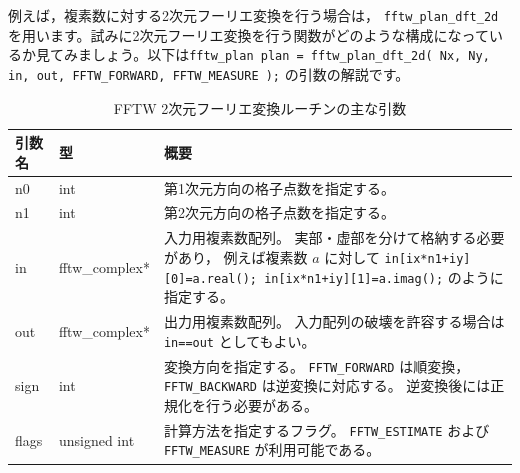 \documentclass[12pt]{jreport}
\begin{document}
例えば，複素数に対する2次元フーリエ変換を行う場合は，
\texttt{fftw\_plan\_dft\_2d} を用います。試みに2次元フーリエ変換を行う関数がどのような構成になっているか見てみましょう。以下は\texttt{fftw_plan plan = fftw_plan_dft_2d(
    Nx, Ny,
    in, out,
    FFTW_FORWARD,
    FFTW_MEASURE
);}
の引数の解説です。


\begin{table}[H]
\centering
\caption{FFTW 2次元フーリエ変換ルーチンの主な引数}
\renewcommand{\arraystretch}{1.3}

\begin{tabularx}{\textwidth}{|l|l|X|}
\hline
\rowcolor{tableblue!20}
\textbf{引数名} & \textbf{型} & \textbf{概要} \\
\hline

n0 & int &
第1次元方向の格子点数を指定する。 \\
\hline

n1 & int &
第2次元方向の格子点数を指定する。 \\
\hline

in & fftw\_complex* &
入力用複素数配列。
実部・虚部を分けて格納する必要があり，
例えば複素数 $a$ に対して
\texttt{in[ix*n1+iy][0]=a.real();\ in[ix*n1+iy][1]=a.imag();}
のように指定する。 \\
\hline

out & fftw\_complex* &
出力用複素数配列。
入力配列の破壊を許容する場合は
\texttt{in==out} としてもよい。 \\
\hline

sign & int &
変換方向を指定する。
\texttt{FFTW\_FORWARD} は順変換，
\texttt{FFTW\_BACKWARD} は逆変換に対応する。
逆変換後には正規化を行う必要がある。 \\
\hline

flags & unsigned int &
計算方法を指定するフラグ。
\texttt{FFTW\_ESTIMATE} および
\texttt{FFTW\_MEASURE} が利用可能である。 \\
\hline

\end{tabularx}
\end{table}
\end{document}
